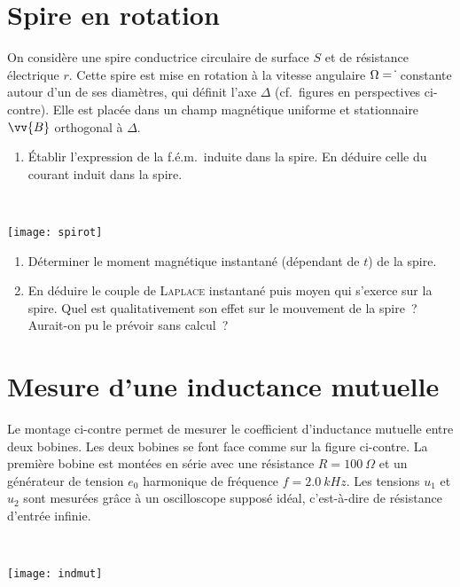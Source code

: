 \documentclass[a4paper, 10pt, final, garamond]{book}
\begin{document}
\section{Spire en rotation}
\label{sec:spirerot}

\noindent
\begin{minipage}[t]{.6\linewidth}
	On considère une spire conductrice circulaire de surface $S$ et de résistance
	électrique $r$. Cette spire est mise en rotation à la vitesse angulaire $\Omega
		= \dot{\tt}$ constante autour d'un de ses diamètres, qui définit l'axe
	$\Delta{}$ (cf.\ figures en perspectives ci-contre). Elle est placée dans un
	champ magnétique uniforme et stationnaire $\vv{B}$ orthogonal à $\Delta{}$.
	\begin{enumerate}
		\item Établir l'expression de la f.é.m.\ induite dans la spire. En déduire
		      celle du courant induit dans la spire.
	\end{enumerate}
\end{minipage}
\hfill
\begin{minipage}[t]{.39\linewidth}
	~
	\vspace{-10pt}
	\begin{center}
		\texttt{[image: spirot]}
		\label{fig:spirot}
	\end{center}
\end{minipage}

\begin{enumerate}[start=2]
	\item Déterminer le moment magnétique instantané (dépendant de $t$) de la spire.
	\item En déduire le couple de \textsc{Laplace} instantané puis moyen qui
	      s'exerce sur la spire. Quel est qualitativement son effet sur le mouvement
	      de la spire~? Aurait-on pu le prévoir sans calcul~?
\end{enumerate}

\section{Mesure d'une inductance mutuelle}
\label{sec:mesindmut}

\noindent
\begin{minipage}[t]{.6\linewidth}
	Le montage ci-contre permet de mesurer le coefficient d'inductance mutuelle
	entre deux bobines. Les deux bobines se font face comme sur la figure
	ci-contre. La première bobine est montées en série avec une résistance $R =
		\SI{100}{\Omega}$ et un générateur de tension $e_0$ harmonique de fréquence $f
		= \SI{2.0}{kHz}$. Les tensions $u_1$ et $u_2$ sont mesurées grâce à un
	oscilloscope supposé idéal, c'est-à-dire de résistance d'entrée infinie.
\end{minipage}
\hfill
\begin{minipage}[t]{.39\linewidth}
	~
	\vspace{-10pt}
	\begin{center}
		\texttt{[image: indmut]}
		\label{fig:mesindmut}
	\end{center}
\end{minipage}
\end{document}

